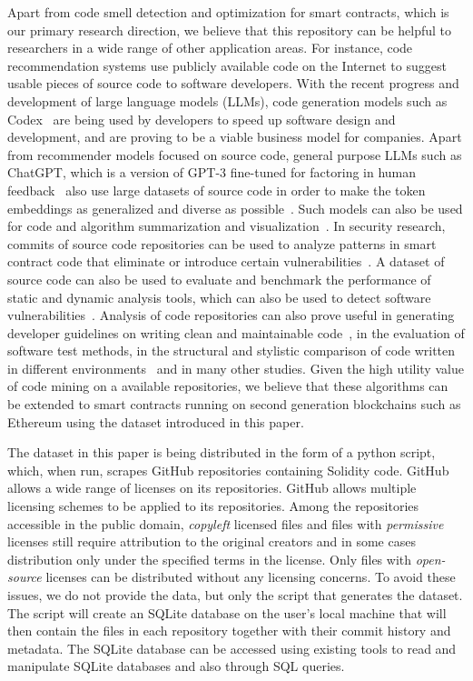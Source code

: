 \documentclass[10pt,conference]{IEEEtran}
\begin{document}
	Apart from code smell detection and optimization for smart contracts, which is our primary research direction, we believe that this repository can be helpful to researchers in a wide range of other application areas. For instance, code recommendation systems use publicly available code on the Internet to suggest usable pieces of source code to software developers. With the recent progress and development of large language models (LLMs), code generation models such as Codex~\cite{codex} are being used by developers to speed up software design and development, and are proving to be a viable business model for companies. Apart from recommender models focused on source code, general purpose LLMs such as ChatGPT, which is a version of GPT-3 fine-tuned for factoring in human feedback~\cite{chatgpt} also use large datasets of source code in order to make the token embeddings as generalized and diverse as possible~\cite{thestack}. Such models can also be used for code and algorithm summarization and visualization~\cite{codesummarization}. In security research, commits of source code repositories can be used to analyze patterns in smart contract code that eliminate or introduce certain vulnerabilities~\cite{securitydataset}. A dataset of source code can also be used to evaluate and benchmark the performance of static and dynamic analysis tools, which can also be used to detect software vulnerabilities~\cite{staticanalysis}. Analysis of code repositories can also prove useful in generating developer guidelines on writing clean and maintainable code~\cite{maintainablecode}, in the evaluation of software test methods\cite{testmethodevaluation}, in the structural and stylistic comparison of code written in different environments~\cite{codestylecomparison} and in many other studies. Given the high utility value of code mining on a available repositories, we believe that these algorithms can be extended to smart contracts running on second generation blockchains such as Ethereum using the dataset introduced in this paper.
	
	The dataset in this paper is being distributed in the form of a python script, which, when run, scrapes GitHub repositories containing Solidity code. GitHub allows a wide range of licenses on its repositories. GitHub allows multiple licensing schemes to be applied to its repositories. Among the repositories accessible in the public domain, \textit{copyleft} licensed files and files with \textit{permissive} licenses still require attribution to the original creators and in some cases distribution only under the specified terms in the license. Only files with \textit{open-source} licenses can be distributed without any licensing concerns. To avoid these issues, we do not provide the data, but only the script that generates the dataset. The script will create an SQLite database on the user's local machine that will then contain the files in each repository together with their commit history and metadata. The SQLite database can be accessed using existing tools to read and manipulate SQLite databases and also through SQL queries.
	
\end{document}
